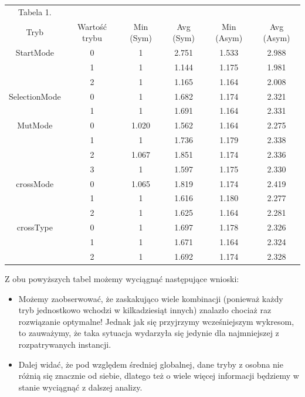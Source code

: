 \documentclass{article}
\begin{document}
\begin{table}[h!]
	\centering
	\begin{tabular}{c|c||c|c||c|c}
Tabela 1. \\
Tryb & Wartość trybu & Min (Sym) & Avg (Sym)  & Min (Asym) & Avg (Asym)\\
\hline
StartMode & 0 & 1 & 2.751 & 1.533 & 2.988\\
 & 1 & 1 & 1.144 & 1.175 & 1.981\\
 & 2 & 1 & 1.165 & 1.164 & 2.008\\
\hline
SelectionMode & 0 & 1 & 1.682 & 1.174 & 2.321\\
 & 1 & 1 & 1.691 & 1.164 & 2.331\\
\hline
MutMode & 0 & 1.020 & 1.562 & 1.164 & 2.275\\
 & 1 & 1 & 1.736 & 1.179 & 2.338\\
 & 2 & 1.067 & 1.851 & 1.174 & 2.336\\
 & 3 & 1 & 1.597 & 1.175 & 2.330\\
\hline
crossMode & 0 & 1.065 & 1.819 & 1.174 & 2.419\\
 & 1 & 1 & 1.616 & 1.180 & 2.277\\
 & 2 & 1 & 1.625 & 1.164 & 2.281\\
\hline
crossType & 0 & 1 & 1.697 & 1.178 & 2.326\\
 & 1 & 1 & 1.671 & 1.164 & 2.324\\
 & 2 & 1 & 1.692 & 1.174 & 2.328\\
	\end{tabular}
\end{table}

Z obu powyższych tabel możemy wyciągnąć następujące wnioski:
\begin{itemize}
	\item Możemy zaobserwować, że zaskakująco wiele kombinacji (ponieważ każdy tryb jednostkowo wchodzi w kilkadziesiąt innych) znalazło chociaż raz rozwiązanie optymalne! Jednak jak się przyjrzymy wcześniejszym wykresom, to zauważymy, że taka sytuacja wydarzyła się jedynie dla najmniejszej z rozpatrywanych instancji.
	\item Dalej widać, że pod względem średniej globalnej, dane tryby z osobna nie różnią się znacznie od siebie, dlatego też o wiele więcej informacji będziemy w stanie wyciągnąć z dalszej analizy.
\end{itemize}
\end{document}

